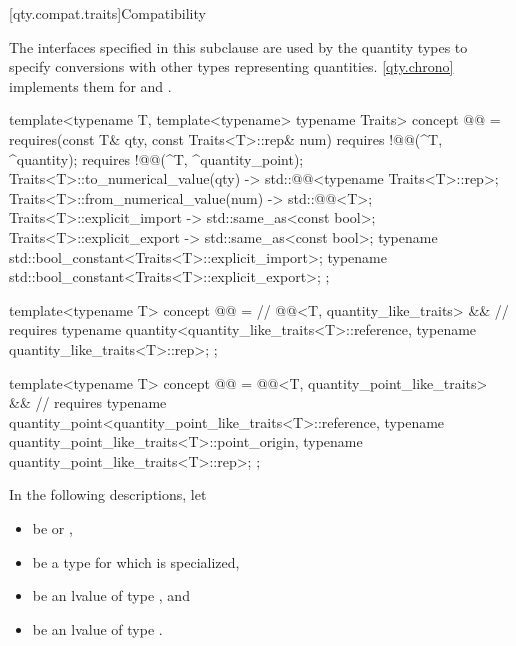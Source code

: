 [qty.compat.traits]{Compatibility}

\pnum
The interfaces specified in this subclause
are used by the quantity types
to specify conversions with other types representing quantities.
\ref{qty.chrono} implements them for  and .

\begin{itemdecl}
template<typename T, template<typename> typename Traits>
concept @@ = requires(const T& qty, const Traits<T>::rep& num) {
  requires !@@(^T, ^quantity);
  requires !@@(^T, ^quantity_point);
  { Traits<T>::to_numerical_value(qty) } -> std::@@<typename Traits<T>::rep>;
  { Traits<T>::from_numerical_value(num) } -> std::@@<T>;
  { Traits<T>::explicit_import } -> std::same_as<const bool>;
  { Traits<T>::explicit_export } -> std::same_as<const bool>;
  typename std::bool_constant<Traits<T>::explicit_import>;
  typename std::bool_constant<Traits<T>::explicit_export>;
};

template<typename T>
concept @@ =                 //
  @@<T, quantity_like_traits> &&  //
  requires {
    typename quantity<quantity_like_traits<T>::reference, typename quantity_like_traits<T>::rep>;
  };

template<typename T>
concept @@ =
  @@<T, quantity_point_like_traits> &&  //
  requires {
    typename quantity_point<quantity_point_like_traits<T>::reference,
                            typename quantity_point_like_traits<T>::point_origin,
                            typename quantity_point_like_traits<T>::rep>;
  };
\end{itemdecl}

\pnum
In the following descriptions, let
\begin{itemize}
\item
{} be  or ,
\item
{} be a type for which  is specialized,
\item
{} be an lvalue of type , and
\item
{} be an lvalue of type .
\end{itemize}

